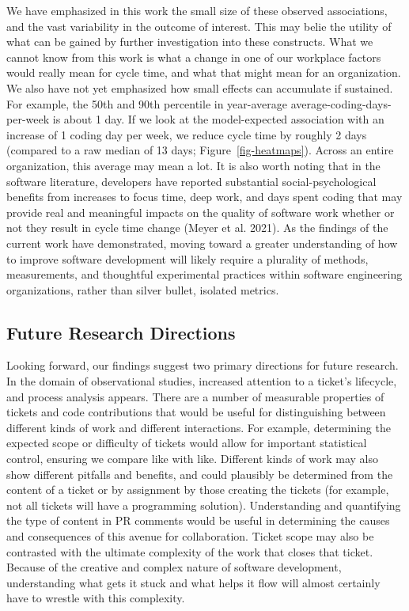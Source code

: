 \documentclass[
]{article}
\begin{document}
We have emphasized in this work the small size of these observed
associations, and the vast variability in the outcome of interest. This
may belie the utility of what can be gained by further investigation
into these constructs. What we cannot know from this work is what a
change in one of our workplace factors would really mean for cycle time,
and what that might mean for an organization. We also have not yet
emphasized how small effects can accumulate if sustained. For example,
the 50th and 90th percentile in year-average
average-coding-days-per-week is about 1 day. If we look at the
model-expected association with an increase of 1 coding day per week, we
reduce cycle time by roughly 2 days (compared to a raw median of 13
days; Figure~\ref{fig-heatmaps}). Across an entire organization, this
average may mean a lot. It is also worth noting that in the software
literature, developers have reported substantial social-psychological
benefits from increases to focus time, deep work, and days spent coding
that may provide real and meaningful impacts on the quality of software
work whether or not they result in cycle time change (Meyer et al.
2021). As the findings of the current work have demonstrated, moving
toward a greater understanding of how to improve software development
will likely require a plurality of methods, measurements, and thoughtful
experimental practices within software engineering organizations, rather
than silver bullet, isolated metrics.

\subsection{Future Research
Directions}\label{future-research-directions}

Looking forward, our findings suggest two primary directions for future
research. In the domain of observational studies, increased attention to
a ticket's lifecycle, and process analysis appears. There are a number
of measurable properties of tickets and code contributions that would be
useful for distinguishing between different kinds of work and different
interactions. For example, determining the expected scope or difficulty
of tickets would allow for important statistical control, ensuring we
compare like with like. Different kinds of work may also show different
pitfalls and benefits, and could plausibly be determined from the
content of a ticket or by assignment by those creating the tickets (for
example, not all tickets will have a programming solution).
Understanding and quantifying the type of content in PR comments would
be useful in determining the causes and consequences of this avenue for
collaboration. Ticket scope may also be contrasted with the ultimate
complexity of the work that closes that ticket. Because of the creative
and complex nature of software development, understanding what gets it
stuck and what helps it flow will almost certainly have to wrestle with
this complexity.
\end{document}
